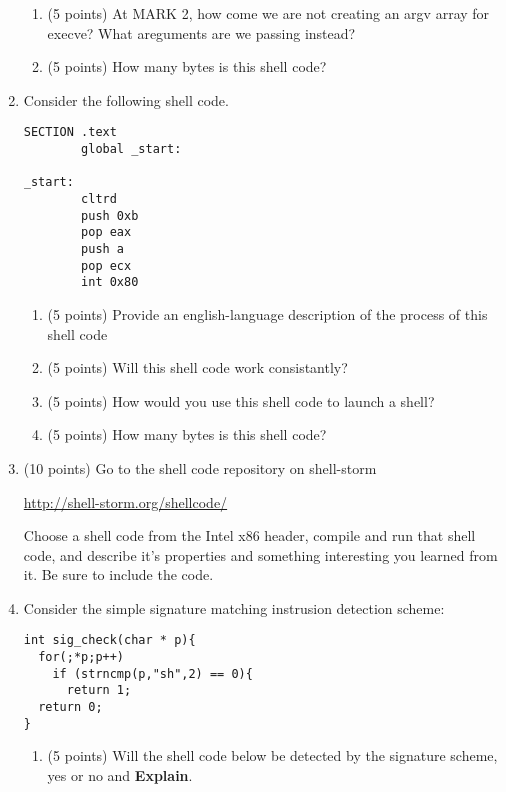 \documentclass{article}[9pt]
\begin{document}
\begin{enumerate}
\begin{enumerate}
\item (5 points) At MARK 2, how come we are not creating an argv array for
execve? What areguments are we passing instead?

\item (5 points) How many bytes is this shell code?
\end{enumerate}

\item Consider the following shell code. 

\begin{verbatim}
SECTION .text
        global _start:

_start:
        cltrd
        push 0xb
        pop eax
        push a
        pop ecx
        int 0x80
\end{verbatim}

\begin{enumerate}
\item (5 points) Provide an english-language description of the process of this shell code

\item (5 points) Will this shell code work consistantly?

\item (5 points) How would you use this shell code to launch a shell?

\item (5 points) How many bytes is this shell code?
\end{enumerate}

\item (10 points) Go to the shell code repository on shell-storm

\url{http://shell-storm.org/shellcode/}

Choose a shell code from the Intel x86 header, compile and run
that shell code, and describe it's properties and something
interesting you learned from it. Be sure to include the code.

\item Consider the simple signature matching instrusion detection scheme:

\begin{verbatim}
int sig_check(char * p){
  for(;*p;p++)
    if (strncmp(p,"sh",2) == 0){
      return 1;
  return 0;
}
\end{verbatim}

\begin{enumerate}
\item (5 points) Will the shell code below be detected by the signature scheme, yes or no and \textbf{Explain}. 


\end{enumerate}
\end{enumerate}
\end{document}
